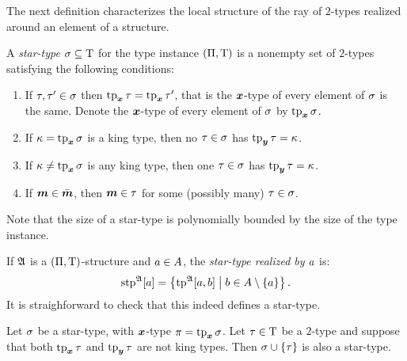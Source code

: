 The next definition characterizes the local structure of the ray of $2$-types
realized around an element of a structure.
\begin{definition}
A \emph{star-type} $\sigma \subseteq \mathrm{T}$ for the type instance
$(\Pi,\mathrm{T})$ is a nonempty set of $2$-types satisfying the following conditions:
\begin{enumerate}
  \item\label{cond:star-1} If $\tau, {\tau'} \in \sigma$ then $\operatorname{tp}_{\bm{x}}\tau =
  \operatorname{tp}_{\bm{x}}{\tau'}$, that is the $\bm{x}$-type of every element of $\sigma$ is the same.
  Denote the $\bm{x}$-type of every element of $\sigma$ by $\operatorname{tp}_{\bm{x}}\sigma$.
  \item\label{cond:star-2} If $\kappa = \operatorname{tp}_{\bm{x}}\sigma$ is a king type, then no $\tau
  \in \sigma$ has $\operatorname{tp}_{\bm{y}}\tau = \kappa$.
  \item\label{cond:star-3} If $\kappa \neq \operatorname{tp}_{\bm{x}}\sigma$ is any king type, then one
  $\tau \in \sigma$ has $\operatorname{tp}_{\bm{y}}\tau = \kappa$.
  \item\label{cond:star-4} If $\bm{m} \in \bar{\bm{m}}$, then $\bm{m} \in \tau$ for some
  (possibly many) $\tau \in \sigma$.
\end{enumerate}
Note that the size of a star-type is polynomially bounded by the size of the
type instance.

If $\mathfrak{A}$ is a $(\Pi,\mathrm{T})$-structure and $a \in A$, the
\emph{star-type realized by $a$} is:
\[
  \operatorname{stp}^{\mathfrak{A}}[a] = \left\{\operatorname{tp}^{\mathfrak{A}}[a,b]\mathrel{}\middle|\mathrel{}b \in A \setminus \left\{a\right\}\right\}.
\]
It is straighforward to check that this indeed defines a star-type.
\end{definition}

\begin{remark}
Let $\sigma$ be a star-type, with $\bm{x}$-type $\pi = \operatorname{tp}_{\bm{x}}\sigma$.
Let $\tau \in \mathrm{T}$ be a $2$-type and suppose that both $\operatorname{tp}_{\bm{x}}\tau$ and
$\operatorname{tp}_{\bm{y}}\tau$ are not king types.
Then $\sigma \cup \left\{\tau\right\}$ is also a star-type.
\end{remark}

